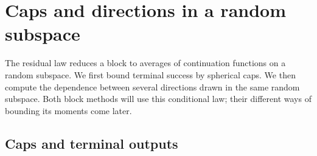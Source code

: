\section{Caps and directions in a random subspace}\label{s:subspace-moments}

The residual law reduces a block to averages of continuation functions
on a random subspace. We first bound terminal success by spherical caps.
We then compute the dependence between several directions drawn in the
same random subspace. Both block methods will use this conditional law;
their different ways of bounding its moments come later.

\subsection{Caps and terminal outputs}

